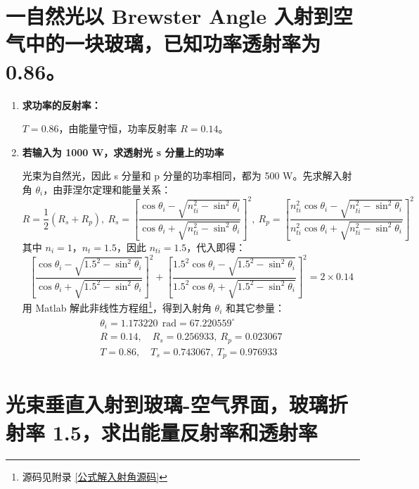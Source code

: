 \documentclass[UTF8]{report}
\theoremstyle{MyLineTheoremStyle} %
\theoremstyle{MyBlockTheoremStyle} %
\theoremstyle{MySubsubsectionStyle} %
\begin{document}
\section{一自然光以 Brewster Angle 入射到空气中的一块玻璃，已知功率透射率为 0.86。}
\begin{enumerate}
\item \textbf{求功率的反射率：}

$T = 0.86$，由能量守恒，功率反射率 $R = 0.14$。
\item \textbf{若输入为 1000 W，求透射光 s 分量上的功率}

光束为自然光，因此 s 分量和 p 分量的功率相同，都为 500 W。先求解入射角 $\theta_i$，由菲涅尔定理和能量关系：
\begin{equation}
R =  \frac{1}{2}(R_s + R_p),\  R_s =  \left[ \frac{ \cos \theta_i - \sqrt{n_{ti}^2 - \sin^2 \theta_i} }{\cos \theta_i + \sqrt{n_{ti}^2 - \sin^2 \theta_i}} \right]^2,\ R_p = \left[ \frac{ n_{ti}^2\cos \theta_i - \sqrt{n_{ti}^2 - \sin^2 \theta_i} }{n_{ti}^2\cos \theta_i + \sqrt{n_{ti}^2 - \sin^2 \theta_i}} \right]^2
\end{equation}
其中 $n_i = 1$，$n_t = 1.5$，因此 $n_{ti} = 1.5$，代入即得：
\begin{equation}
    \left[ \frac{ \cos \theta_i - \sqrt{1.5^2 - \sin^2 \theta_i} }{\cos \theta_i + \sqrt{1.5^2 - \sin^2 \theta_i}} \right]^2 + \left[ \frac{ 1.5^2\cos \theta_i - \sqrt{1.5^2 - \sin^2 \theta_i} }{1.5^2\cos \theta_i + \sqrt{1.5^2 - \sin^2 \theta_i}} \right]^2 = 2\times0.14
\end{equation}
用 Matlab 解此非线性方程组\footnote{源码见附录 \ref{公式解入射角源码}}，得到入射角 $\theta_i$ 和其它参量：
\begin{gather}\label{解入射角}
\begin{matrix}
    \theta_i =  1.173220\ \ \mathrm{rad}  = 67.220559^\circ \\
    R = 0.14,\quad   R_s = 0.256933,\    R_p = 0.023067 \\ 
    T = 0.86,\quad   T_s = 0.743067,\    T_p = 0.976933 
\end{matrix}
\end{gather}

\end{enumerate}

\section{光束垂直入射到玻璃-空气界面，玻璃折射率 1.5，求出能量反射率和透射率}
\end{document}
